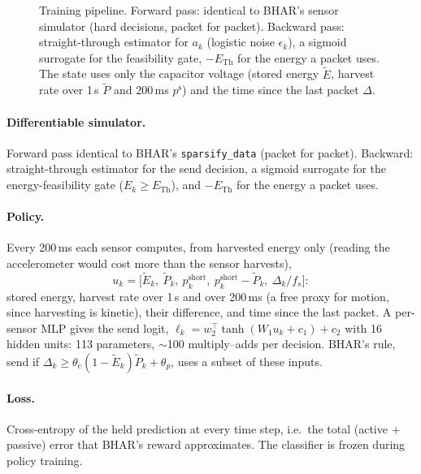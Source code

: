 \documentclass[10pt]{article}
\newcommand{\Eth}{E_{\mathrm{Th}}}
\begin{document}
\begin{figure}[t]
\caption{Training pipeline. Forward pass: identical to BHAR's sensor simulator (hard decisions, packet for packet). Backward pass: straight-through estimator for $a_k$ (logistic noise $\epsilon_k$), a sigmoid surrogate for the feasibility gate, $-\Eth$ for the energy a packet uses. The state uses only the capacitor voltage (stored energy $\tilde E$, harvest rate over 1\,s $\tilde P$ and 200\,ms $p^{\mathrm s}$) and the time since the last packet $\Delta$.}
\label{fig:pipeline}
\end{figure}


\paragraph{Differentiable simulator.} Forward pass identical to BHAR's \texttt{sparsify\_data} (packet for packet). Backward: straight-through estimator for the send decision, a sigmoid surrogate for the energy-feasibility gate ($E_k \ge \Eth$), and $-\Eth$ for the energy a packet uses.

\paragraph{Policy.} Every 200\,ms each sensor computes, from harvested energy only (reading the accelerometer would cost more than the sensor harvests),
\[
u_k = \big[\tilde E_k,\ \tilde P_k,\ p^{\text{short}}_k,\ p^{\text{short}}_k-\tilde P_k,\ \Delta_k/f_s\big]:
\]
stored energy, harvest rate over 1\,s and over 200\,ms (a free proxy for motion, since harvesting is kinetic), their difference, and time since the last packet. A per-sensor MLP gives the send logit, $\ell_k = w_2^\top \tanh(W_1 u_k + c_1) + c_2$ with 16 hidden units: 113 parameters, $\sim$100 multiply--adds per decision. BHAR's rule, send if $\Delta_k \ge \theta_e(1-\tilde E_k)\tilde P_k + \theta_p$, uses a subset of these inputs.

\paragraph{Loss.} Cross-entropy of the held prediction at every time step, i.e.\ the total (active + passive) error that BHAR's reward approximates. The classifier is frozen during policy training.
\end{document}
